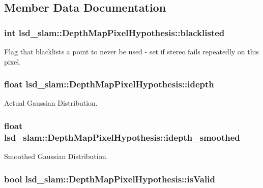 \subsection{Member Data Documentation}
\hypertarget{classlsd__slam_1_1_depth_map_pixel_hypothesis_a27273a9266af3c4fb91147febeae020a}{
\subsubsection[{blacklisted}]{\setlength{\rightskip}{0pt plus 5cm}int lsd\-\_\-slam\-::\-Depth\-Map\-Pixel\-Hypothesis\-::blacklisted}}\label{classlsd__slam_1_1_depth_map_pixel_hypothesis_a27273a9266af3c4fb91147febeae020a}
Flag that blacklists a point to never be used -\/ set if stereo fails repeatedly on this pixel. \hypertarget{classlsd__slam_1_1_depth_map_pixel_hypothesis_abfc19276c22e1c4fae82f61054a4579f}{
\subsubsection[{idepth}]{\setlength{\rightskip}{0pt plus 5cm}float lsd\-\_\-slam\-::\-Depth\-Map\-Pixel\-Hypothesis\-::idepth}}\label{classlsd__slam_1_1_depth_map_pixel_hypothesis_abfc19276c22e1c4fae82f61054a4579f}
Actual Gaussian Distribution. \hypertarget{classlsd__slam_1_1_depth_map_pixel_hypothesis_a82ac6c0b56d05a755373fdf23a9cacb2}{
\subsubsection[{idepth\-\_\-smoothed}]{\setlength{\rightskip}{0pt plus 5cm}float lsd\-\_\-slam\-::\-Depth\-Map\-Pixel\-Hypothesis\-::idepth\-\_\-smoothed}}\label{classlsd__slam_1_1_depth_map_pixel_hypothesis_a82ac6c0b56d05a755373fdf23a9cacb2}
Smoothed Gaussian Distribution. \hypertarget{classlsd__slam_1_1_depth_map_pixel_hypothesis_aba28a1bf8203d9e0e323b9015d4ac425}{
\subsubsection[{is\-Valid}]{\setlength{\rightskip}{0pt plus 5cm}bool lsd\-\_\-slam\-::\-Depth\-Map\-Pixel\-Hypothesis\-::is\-Valid}}\label{classlsd__slam_1_1_depth_map_pixel_hypothesis_aba28a1bf8203d9e0e323b9015d4ac425}
